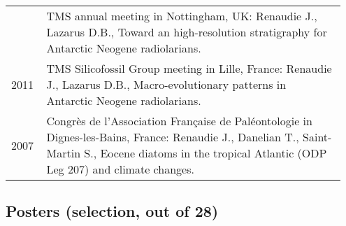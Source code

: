 \documentclass[11pt, a4paper]{article}
\begin{document}
\begin{longtable}{p{0.1\linewidth} P{0.85\linewidth}}
 & TMS annual meeting in Nottingham, UK: Renaudie J., Lazarus D.B., Toward an high-resolution stratigraphy for Antarctic Neogene radiolarians.\\
2011 & TMS Silicofossil Group meeting in Lille, France: Renaudie J., Lazarus D.B., Macro-evolutionary patterns in Antarctic Neogene radiolarians.\\
2007 & Congr\`{e}s de l'Association Fran\c{c}aise de Pal\'{e}ontologie in Dignes-les-Bains, France: Renaudie J., Danelian T., Saint-Martin S., Eocene diatoms in the tropical Atlantic (ODP Leg 207) and climate changes.\\
\end{longtable}
\subsection{Posters \textnormal{(selection, out of 28)}}
\end{document}
